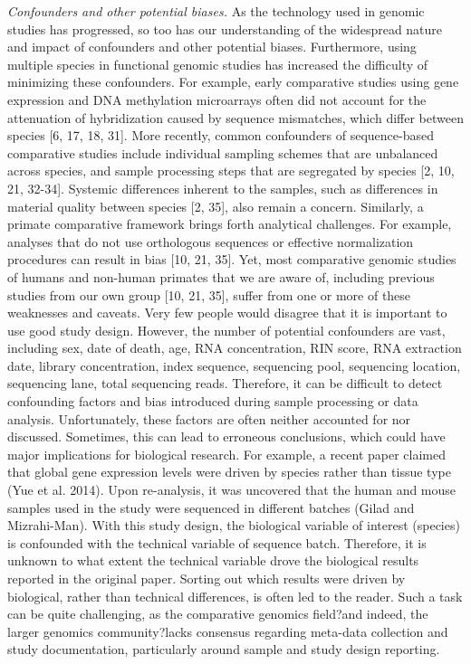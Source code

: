 \textit{Confounders and other potential biases.} As the technology used in genomic studies has progressed, so too has our understanding of the widespread nature and impact of confounders and other potential biases. Furthermore, using multiple species in functional genomic studies has increased the difficulty of minimizing these confounders. For example, early comparative studies using gene expression and DNA methylation microarrays often did not account for the attenuation of hybridization caused by sequence mismatches, which differ between species [6, 17, 18, 31]. More recently, common confounders of sequence-based comparative studies include individual sampling schemes that are unbalanced across species, and sample processing steps that are segregated by species [2, 10, 21, 32-34]. Systemic differences inherent to the samples, such as differences in material quality between species [2, 35], also remain a concern. Similarly, a primate comparative framework brings forth analytical challenges. For example, analyses that do not use orthologous sequences or effective normalization procedures can result in bias [10, 21, 35]. Yet, most comparative genomic studies of humans and non-human primates that we are aware of, including previous studies from our own group [10, 21, 35], suffer from one or more of these weaknesses and caveats. 
Very few people would disagree that it is important to use good study design. However, the number of potential confounders are vast, including sex, date of death, age, RNA concentration, RIN score, RNA extraction date, library concentration, index sequence, sequencing pool, sequencing location, sequencing lane, total sequencing reads. Therefore, it can be difficult to detect confounding factors and bias introduced during sample processing or data analysis. Unfortunately, these factors are often neither accounted for nor discussed. Sometimes, this can lead to erroneous conclusions, which could have major implications for biological research. For example, a recent paper claimed that global gene expression levels were driven by species rather than tissue type (Yue et al. 2014). Upon re-analysis, it was uncovered that the human and mouse samples used in the study were sequenced in different batches (Gilad and Mizrahi-Man). With this study design, the biological variable of interest (species) is confounded with the technical variable of sequence batch. Therefore, it is unknown to what extent the technical variable drove the biological results reported in the original paper. 
Sorting out which results were driven by biological, rather than technical differences, is often led to the reader. Such a task can be quite challenging, as the comparative genomics field?and indeed, the larger genomics community?lacks consensus regarding meta-data collection and study documentation, particularly around sample and study design reporting. 

